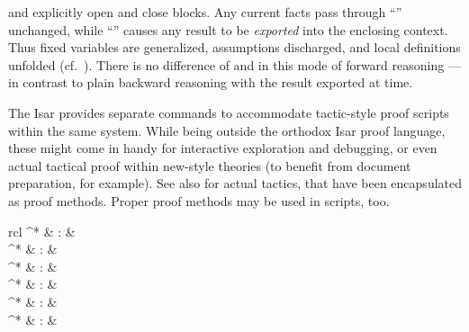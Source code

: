 \begin{isabellebody}
\begin{isamarkuptext}
\begin{descr}
  \item [\isa{\isacommand{{\isacharbraceleft}}} and \isa{\isacommand{{\isacharbraceright}}}] explicitly open and close
  blocks.  Any current facts pass through ``\isa{\isacommand{{\isacharbraceleft}}}''
  unchanged, while ``\isa{\isacommand{{\isacharbraceright}}}'' causes any result to be
  \emph{exported} into the enclosing context.  Thus fixed variables
  are generalized, assumptions discharged, and local definitions
  unfolded (cf.\ ).  There is no difference
  of  and  in this mode of
  forward reasoning --- in contrast to plain backward reasoning with
  the result exported at  time.

  \end{descr}%
\end{isamarkuptext}%
\isamarkuptrue%
%
\isamarkuptrue%
%
\begin{isamarkuptext}%
The Isar provides separate commands to accommodate tactic-style
  proof scripts within the same system.  While being outside the
  orthodox Isar proof language, these might come in handy for
  interactive exploration and debugging, or even actual tactical proof
  within new-style theories (to benefit from document preparation, for
  example).  See also  for actual tactics, that
  have been encapsulated as proof methods.  Proper proof methods may
  be used in scripts, too.

  \begin{matharray}{rcl}
    ^* & : &  \\
    ^* & : &  \\
    ^* & : &  \\
    ^* & : &  \\
    ^* & : &  \\
    ^* & : &  \\
  \end{matharray}


\end{isamarkuptext}
\end{isabellebody}
